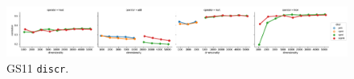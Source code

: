 \begin{figure}
  \centering

  \includegraphics[width=1.1\textwidth]{supplement/figures/gs11-interaction-discr}

  \caption{GS11 \texttt{discr}.}
  \label{fig:gs11-discr}
\end{figure}
